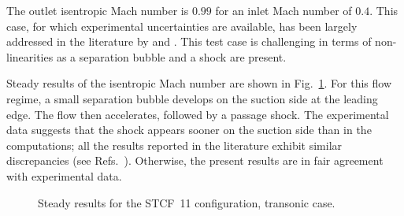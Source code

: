 
The outlet isentropic Mach number is $0.99$ for an inlet Mach number of $0.4$. 
This case, for which experimental uncertainties are available, 
has been largely addressed in the literature by
\citet{Sbardella2001,Duta2002,Campobasso2003} and \citet{Cinnella2004}. 
This test case is challenging in terms of non-linearities as a separation bubble and a shock are present.

Steady results of the isentropic Mach number are shown in
Fig.~\ref{fig:stcf11_rans_transonic}.  For this flow regime,
a small separation
bubble develops on the suction side at the leading edge.  
The flow then accelerates, followed by a passage shock.  
The experimental data suggests that the shock appears
sooner on the suction side than in the computations; all the results 
reported in the literature exhibit similar discrepancies (see
Refs.~\cite{Fransson1999,Sbardella2001,Duta2002,Campobasso2003,Cinnella2004}). 
Otherwise, the present results are in fair agreement with experimental data.
\begin{figure}[htb]
  \centering
  \caption{Steady results for the STCF~11 configuration, transonic case.}
  \label{fig:stcf11_rans_transonic}
\end{figure}

